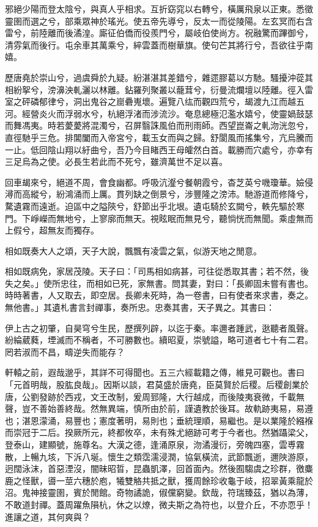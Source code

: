 \begin{pinyinscope}
邪絕少陽而登太陰兮，與真人乎相求。互折窈窕以右轉兮，橫厲飛泉以正東。悉徵靈圉而選之兮，部乘眾神於瑤光。使五帝先導兮，反太一而從陵陽。左玄冥而右含雷兮，前陸離而後潏湟。廝征伯僑而役羨門兮，屬岐伯使尚方。祝融驚而蹕御兮，清雰氣而後行。屯余車其萬乘兮，綷雲蓋而樹華旗。使句芒其將行兮，吾欲往乎南嬉。

歷唐堯於崇山兮，過虞舜於九疑。紛湛湛其差錯兮，雜遝膠葛以方馳。騷擾沖蓯其相紛挐兮，滂濞泱軋灑以林離。鉆羅列聚叢以蘢茸兮，衍曼流爛壇以陸離。徑入雷室之砰磷郁律兮，洞出鬼谷之崫礨嵬壞。遍覽八纮而觀四荒兮，朅渡九江而越五河。經營炎火而浮弱水兮，杭絕浮渚而涉流沙。奄息總極氾濫水嬉兮，使靈媧鼓瑟而舞馮夷。時若薆薆將混濁兮，召屏翳誅風伯而刑雨師。西望崑崙之軋沕洸忽兮，直徑馳乎三危。排閶闔而入帝宮兮，載玉女而與之歸。舒閬風而搖集兮，亢烏騰而一止。低回陰山翔以紆曲兮，吾乃今目睹西王母皬然白首。載勝而穴處兮，亦幸有三足烏為之使。必長生若此而不死兮，雖濟萬世不足以喜。

回車朅來兮，絕道不周，會食幽都。呼吸沆瀣兮餐朝霞兮，杳芝英兮嘰瓊華。嬐侵潯而高縱兮，紛鴻涌而上厲。貫列缺之倒景兮，涉豐隆之滂沛。馳游道而修降兮，騖遺霧而遠逝。迫區中之隘陝兮，舒節出乎北垠。遺屯騎於玄闕兮，軼先驅於寒門。下崢嶸而無地兮，上寥廓而無天。視眩眠而無見兮，聽惝恍而無聞。乘虛無而上假兮，超無友而獨存。

相如既奏大人之頌，天子大說，飄飄有凌雲之氣，似游天地之閒意。

相如既病免，家居茂陵。天子曰：「司馬相如病甚，可往從悉取其書；若不然，後失之矣。」使所忠往，而相如已死，家無書。問其妻，對曰：「長卿固未嘗有書也。時時著書，人又取去，即空居。長卿未死時，為一卷書，曰有使者來求書，奏之。無他書。」其遺札書言封禪事，奏所忠。忠奏其書，天子異之。其書曰：

伊上古之初肇，自昊穹兮生民，歷撰列辟，以迄于秦。率邇者踵武，逖聽者風聲。紛綸葳蕤，堙滅而不稱者，不可勝數也。續昭夏，崇號謚，略可道者七十有二君。罔若淑而不昌，疇逆失而能存？

軒轅之前，遐哉邈乎，其詳不可得聞也。五三六經載籍之傳，維見可觀也。書曰「元首明哉，股肱良哉」。因斯以談，君莫盛於唐堯，臣莫賢於后稷。后稷創業於唐，公劉發跡於西戎，文王改制，爰周郅隆，大行越成，而後陵夷衰微，千載無聲，豈不善始善終哉。然無異端，慎所由於前，謹遺教於後耳。故軌跡夷易，易遵也；湛恩濛涌，易豐也；憲度著明，易則也；垂統理順，易繼也。是以業隆於繦褓而崇冠于二后。揆厥所元，終都攸卒，未有殊尤絕跡可考于今者也。然猶躡梁父，登泰山，建顯號，施尊名。大漢之德，逢涌原泉，沕潏漫衍，旁魄四塞，雲尃霧散，上暢九垓，下泝八埏。懷生之類霑濡浸潤，協氣橫流，武節飄逝，邇陜游原，迥闊泳沫，首惡湮沒，闇昧昭晢，昆蟲凱澤，回首面內。然後囿騶虞之珍群，徼麋鹿之怪獸，噵一莖六穗於庖，犧雙觡共抵之獸，獲周餘珍收龜于岐，招翠黃乘龍於沼。鬼神接靈圉，賓於閒館。奇物譎詭，俶儻窮變。欽哉，符瑞臻茲，猶以為薄，不敢道封禪。蓋周躍魚隕杭，休之以燎，微夫斯之為符也，以登介丘，不亦恧乎！進讓之道，其何爽與？


\end{pinyinscope}
